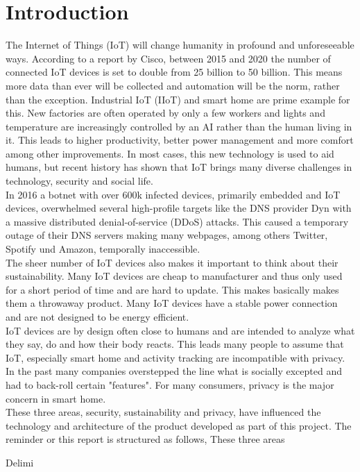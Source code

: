 \section{Introduction}
The Internet of Things (IoT) will change humanity in profound and unforeseeable ways\cite{ciscoReport}. According to a report by Cisco, between 2015 and 2020 the number of connected IoT devices is set to double from 25 billion to 50 billion\cite{ciscoReport}. This means more data than ever will be collected and automation will be the norm, rather than the exception. Industrial IoT (IIoT) and smart home are prime example for this. New factories are often operated by only a few workers and lights and temperature are increasingly controlled by an AI rather than the human living in it. This leads to higher productivity, better power management and more comfort among other improvements. In most cases, this new technology is used to aid humans, but recent history has shown that IoT brings many diverse challenges in technology, security and social life.\\
In 2016 a botnet with over 600k infected devices, primarily embedded and IoT devices, overwhelmed several high-profile targets like the DNS provider Dyn with a massive distributed denial-of-service (DDoS) attacks. This caused a temporary outage of their DNS servers making many webpages, among others  Twitter, Spotify und Amazon, temporally inaccessible.\\
The sheer number of IoT devices also makes it important to think about their sustainability. Many IoT devices are cheap to manufacturer and thus only used for a short period of time and are hard to update. This makes basically makes them a throwaway product. Many IoT devices have a stable power connection and are not designed to be energy efficient. \\
IoT devices are by design often close to humans and are intended to analyze what they say, do and how their body reacts. This leads many people to assume that IoT, especially smart home and activity tracking are incompatible with privacy\cite{5Reasons41:online}. In the past many companies overstepped the line what is socially excepted and had to back-roll certain "features"\cite{PrivacyIoT50:online}. For many consumers, privacy is the major concern in smart home\cite{PrivacyIoT50:online}.\\
These three areas, security, sustainability and privacy, have influenced the technology and architecture of the product developed as part of this project. The reminder or this report is structured as follows,  
These three areas

Delimi